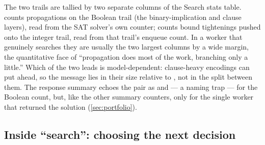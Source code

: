 \begin{platypuslog}[htb]
The two trails are tallied by two separate columns of the \textsf{Search stats}
table.  counts propagations on the Boolean trail (the
binary-implication and clause layers), read from the SAT solver's own counter;
 counts bound tightenings pushed onto the integer trail, read
from that trail's enqueue count. In a worker that genuinely searches they are
usually the two largest columns by a wide margin, the quantitative face of
``propagation does most of the work, branching only a little.'' Which of the two
leads is model-dependent: clause-heavy encodings can put  ahead,
so the message lies in their size relative to , not in the split
between them. The response summary echoes the pair as 
and --- a naming trap ---  for the Boolean count, but, like the
other summary counters, only for the single worker that returned the solution
(\cref{sec:portfolio}).
\end{platypuslog}

\subsection{Inside ``search'': choosing the next decision}\label{sec:search}

